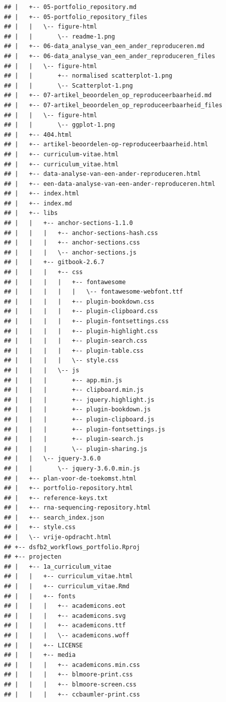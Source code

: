\documentclass[
]{book}
\begin{document}
\begin{verbatim}
## |   +-- 05-portfolio_repository.md
## |   +-- 05-portfolio_repository_files
## |   |   \-- figure-html
## |   |       \-- readme-1.png
## |   +-- 06-data_analyse_van_een_ander_reproduceren.md
## |   +-- 06-data_analyse_van_een_ander_reproduceren_files
## |   |   \-- figure-html
## |   |       +-- normalised scatterplot-1.png
## |   |       \-- Scatterplot-1.png
## |   +-- 07-artikel_beoordelen_op_reproduceerbaarheid.md
## |   +-- 07-artikel_beoordelen_op_reproduceerbaarheid_files
## |   |   \-- figure-html
## |   |       \-- ggplot-1.png
## |   +-- 404.html
## |   +-- artikel-beoordelen-op-reproduceerbaarheid.html
## |   +-- curriculum-vitae.html
## |   +-- curriculum_vitae.html
## |   +-- data-analyse-van-een-ander-reproduceren.html
## |   +-- een-data-analyse-van-een-ander-reproduceren.html
## |   +-- index.html
## |   +-- index.md
## |   +-- libs
## |   |   +-- anchor-sections-1.1.0
## |   |   |   +-- anchor-sections-hash.css
## |   |   |   +-- anchor-sections.css
## |   |   |   \-- anchor-sections.js
## |   |   +-- gitbook-2.6.7
## |   |   |   +-- css
## |   |   |   |   +-- fontawesome
## |   |   |   |   |   \-- fontawesome-webfont.ttf
## |   |   |   |   +-- plugin-bookdown.css
## |   |   |   |   +-- plugin-clipboard.css
## |   |   |   |   +-- plugin-fontsettings.css
## |   |   |   |   +-- plugin-highlight.css
## |   |   |   |   +-- plugin-search.css
## |   |   |   |   +-- plugin-table.css
## |   |   |   |   \-- style.css
## |   |   |   \-- js
## |   |   |       +-- app.min.js
## |   |   |       +-- clipboard.min.js
## |   |   |       +-- jquery.highlight.js
## |   |   |       +-- plugin-bookdown.js
## |   |   |       +-- plugin-clipboard.js
## |   |   |       +-- plugin-fontsettings.js
## |   |   |       +-- plugin-search.js
## |   |   |       \-- plugin-sharing.js
## |   |   \-- jquery-3.6.0
## |   |       \-- jquery-3.6.0.min.js
## |   +-- plan-voor-de-toekomst.html
## |   +-- portfolio-repository.html
## |   +-- reference-keys.txt
## |   +-- rna-sequencing-repository.html
## |   +-- search_index.json
## |   +-- style.css
## |   \-- vrije-opdracht.html
## +-- dsfb2_workflows_portfolio.Rproj
## +-- projecten
## |   +-- 1a_curriculum_vitae
## |   |   +-- curriculum_vitae.html
## |   |   +-- curriculum_vitae.Rmd
## |   |   +-- fonts
## |   |   |   +-- academicons.eot
## |   |   |   +-- academicons.svg
## |   |   |   +-- academicons.ttf
## |   |   |   \-- academicons.woff
## |   |   +-- LICENSE
## |   |   +-- media
## |   |   |   +-- academicons.min.css
## |   |   |   +-- blmoore-print.css
## |   |   |   +-- blmoore-screen.css
## |   |   |   +-- ccbaumler-print.css

\end{verbatim}
\end{document}
